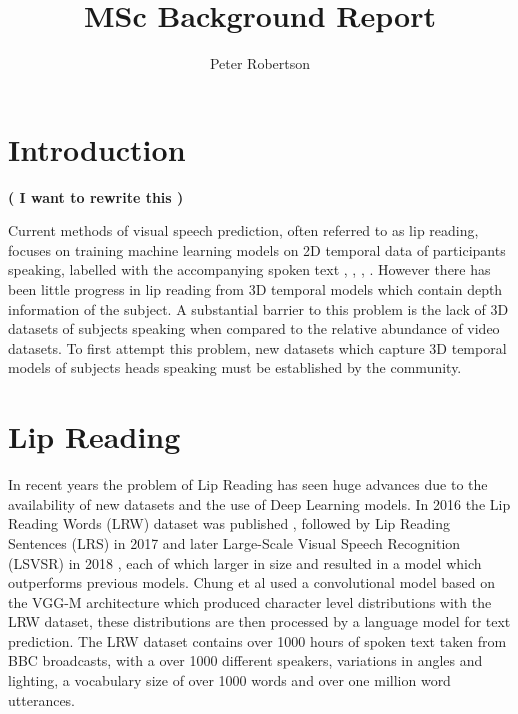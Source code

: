 \documentclass[12pt]{article}
\title{MSc Background Report}
\author{Peter Robertson}
\date{}
\begin{document}
\maketitle

\setcounter{page}{0}
\clearpage{\pagestyle{empty}\cleardoublepage}

\tableofcontents 
\clearpage{\pagestyle{empty}\cleardoublepage}


\setcounter{page}{1}

\section{Introduction}

\textbf{( I want to rewrite this )}

Current methods of visual speech prediction, often referred to as lip reading, focuses on training machine learning models on 2D temporal data of participants speaking, labelled with the accompanying spoken text \cite{Chung2016}, \cite{Assael2016}, \cite{Chung2017}, \cite{Shillingford2018}.
However there has been little progress in lip reading from 3D temporal models which contain depth information of the subject.
A substantial barrier to this problem is the lack of 3D datasets of subjects speaking when compared to the relative abundance of video datasets.
To first attempt this problem, new datasets which capture 3D temporal models of subjects heads speaking must be established by the community.

\section{Lip Reading}
In recent years the problem of Lip Reading has seen huge advances due to the availability of new datasets and the use of Deep Learning models.
In 2016 the Lip Reading Words (LRW) dataset was published \cite{Chung2016}, followed by Lip Reading Sentences (LRS) in 2017 \cite{Chung2017} and later Large-Scale Visual Speech Recognition (LSVSR) in 2018 \cite{Shillingford2018}, each of which larger in size and resulted in a model which outperforms previous models.
Chung et al \cite{Chung2016} used a convolutional model based on the VGG-M architecture which produced character level distributions with the LRW dataset, these distributions are then processed by a language model for text prediction.
The LRW dataset contains over 1000 hours of spoken text taken from BBC broadcasts, with a over 1000 different speakers, variations in angles and lighting, a vocabulary size of over 1000 words and over one million word utterances.
\end{document}
